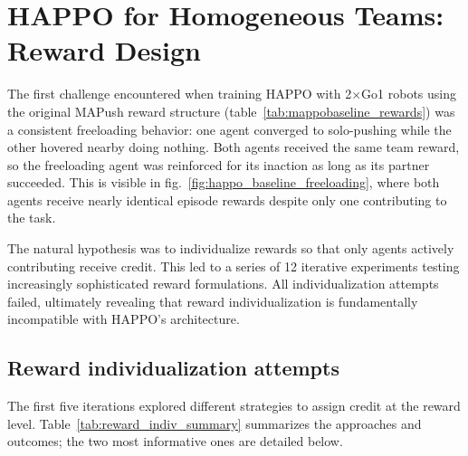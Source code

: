 \section{HAPPO for Homogeneous Teams: Reward Design}
\label{sec:happo_reward_design}

The first challenge encountered when training HAPPO with 2$\times$Go1 robots using the original MAPush reward structure (table~\ref{tab:mappobaseline_rewards}) was a consistent freeloading behavior: one agent converged to solo-pushing while the other hovered nearby doing nothing. Both agents received the same team reward, so the freeloading agent was reinforced for its inaction as long as its partner succeeded. This is visible in fig.~\ref{fig:happo_baseline_freeloading}, where both agents receive nearly identical episode rewards despite only one contributing to the task.

The natural hypothesis was to individualize rewards so that only agents actively contributing receive credit. This led to a series of 12 iterative experiments testing increasingly sophisticated reward formulations. All individualization attempts failed, ultimately revealing that reward individualization is fundamentally incompatible with HAPPO's architecture.


\subsection{Reward individualization attempts}
\label{sec:reward_indiv}

The first five iterations explored different strategies to assign credit at the reward level. Table~\ref{tab:reward_indiv_summary} summarizes the approaches and outcomes; the two most informative ones are detailed below.


